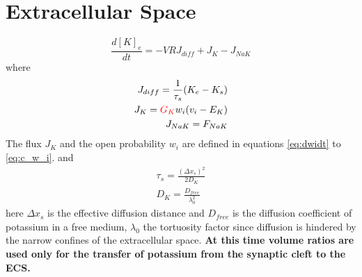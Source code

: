 \documentclass[fleqn]{report}
\numberwithin{equation}{section}
\numberwithin{equation}{section}
\newcommand{\LArg}{\text{L-Arg}}
\newcommand{\Otwo}{\text{O$_2$}}
\begin{document}
	\section{Extracellular Space}
	\begin{equation}
	\frac{d[K]_e}{dt}=-VRJ_{diff}+J_K-J_{NaK}
	\end{equation}
	where
	\begin{eqnarray}
	J_{diff}=\frac{1}{\tau_s}(K_{e}-K_s)\\
	J_K=\textcolor{red}{G_K} w_i(v_i-E_K)\\
	J_{NaK}=F_{NaK}
	\end{eqnarray}
	The flux $J_K$ and the open probability $w_{i}$ are defined in equations \ref{eq:dwidt} to \ref{eq:c_w_i}.
	and 
	\begin{eqnarray}\label{eqn:potassium_diff_time}
	\tau_s=\frac{(\Delta x_s)^2}{2D_K}\\
		 D_K=\frac{D_{free}}{\lambda^{2}_{0}}
	\end{eqnarray}
	here $\Delta x_s$ is the effective diffusion distance and $D_{free}$ is the diffusion coefficient of potassium in a free medium, $\lambda_{0}$ the tortuosity factor since diffusion is hindered by the narrow confines of the extracellular space. \textbf{At this time volume ratios are used only for the transfer of potassium from the synaptic cleft to the ECS. }
		
\end{document}
